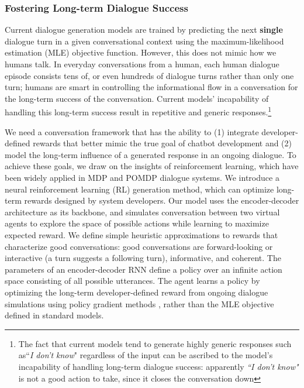 \subsubsection*{Fostering Long-term Dialogue Success}
Current dialogue generation models are trained by predicting the next {\bf single} dialogue turn in a given conversational context using the maximum-likelihood estimation (MLE) objective function. 
However, this does not mimic how we humans talk. In everyday conversations from a human, each human dialogue episode consists tens of, or even hundreds of dialogue turns rather than only one turn; humans are
smart in controlling the informational flow in a conversation for the long-term success of the conversation. 
Current models' incapability of handling this long-term success result in repetitive and generic responses.\footnote{The fact that current models tend to generate highly generic responses such as``{\it I don't know}" regardless of the input \cite{sordoni2015neural,serban2015hierarchical,li2015diversity} can be ascribed to the model's incapability of handling long-term dialogue success:
apparently {\it ``I don't know"} is not a good action to take, since it closes the conversation down} 

We need a conversation framework that has the ability to (1)  integrate developer-defined rewards that better mimic the true goal of chatbot development
  and (2)  model the long-term influence of a generated response in an ongoing dialogue.
To achieve these goals,  we draw on the insights of reinforcement learning, which
have been widely applied in MDP and POMDP dialogue systems.
We introduce a neural reinforcement learning (RL) generation method, 
which can optimize long-term rewards designed by system developers.
Our model uses the encoder-decoder architecture as its backbone, and 
 simulates conversation between two virtual agents to explore the space of possible actions while learning to maximize expected reward.
We define simple heuristic approximations to rewards that characterize
 good conversations: good conversations are forward-looking \cite{All92} or interactive (a turn suggests
 a following turn), informative, and coherent.
  The parameters of an encoder-decoder RNN define a policy over an infinite action space consisting of all possible utterances.
  The agent learns a policy by optimizing the long-term developer-defined reward from ongoing dialogue simulations using policy gradient methods \cite{williams1992simple},
  rather than the MLE objective defined in standard \sts models. 

